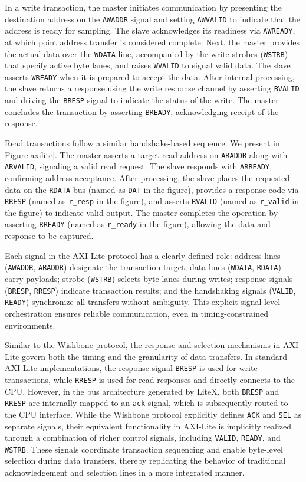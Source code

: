 In a write transaction, the master initiates communication by presenting the destination address on the \texttt{AWADDR} signal and setting \texttt{AWVALID} to indicate that the address is ready for sampling. The slave acknowledges its readiness via \texttt{AWREADY}, at which point address transfer is considered complete. Next, the master provides the actual data over the \texttt{WDATA} line, accompanied by the write strobes (\texttt{WSTRB}) that specify active byte lanes, and raises \texttt{WVALID} to signal valid data. The slave asserts \texttt{WREADY} when it is prepared to accept the data. After internal processing, the slave returns a response using the write response channel by asserting \texttt{BVALID} and driving the \texttt{BRESP} signal to indicate the status of the write. The master concludes the transaction by asserting \texttt{BREADY}, acknowledging receipt of the response.

Read transactions follow a similar handshake-based sequence. We present in Figure\ref{axilite}. The master asserts a target read address on \texttt{ARADDR} along with \texttt{ARVALID}, signaling a valid read request. The slave responds with \texttt{ARREADY}, confirming address acceptance. After processing, the slave places the requested data on the \texttt{RDATA} bus (named as \texttt{DAT} in the figure), provides a response code via \texttt{RRESP} (named as \texttt{r\_resp} in the figure), and asserts \texttt{RVALID} (named as \texttt{r\_valid} in the figure) to indicate valid output. The master completes the operation by asserting \texttt{RREADY} (named as \texttt{r\_ready} in the figure), allowing the data and response to be captured.

Each signal in the AXI-Lite protocol has a clearly defined role: address lines (\texttt{AWADDR}, \texttt{ARADDR}) designate the transaction target; data lines (\texttt{WDATA}, \texttt{RDATA}) carry payloads; strobe (\texttt{WSTRB}) selects byte lanes during writes; response signals (\texttt{BRESP}, \texttt{RRESP}) indicate transaction results; and the handshaking signals (\texttt{VALID}, \texttt{READY}) synchronize all transfers without ambiguity. This explicit signal-level orchestration ensures reliable communication, even in timing-constrained environments.

Similar to the Wishbone protocol, the response and selection mechanisms in AXI-Lite govern both the timing and the granularity of data transfers. In standard AXI-Lite implementations, the response signal \texttt{BRESP} is used for write transactions, while \texttt{RRESP} is used for read responses and directly connects to the CPU. However, in the bus architecture generated by LiteX, both \texttt{BRESP} and \texttt{RRESP} are internally mapped to an \texttt{ack} signal, which is subsequently routed to the CPU interface. While the Wishbone protocol explicitly defines \texttt{ACK} and \texttt{SEL} as separate signals, their equivalent functionality in AXI-Lite is implicitly realized through a combination of richer control signals, including \texttt{VALID}, \texttt{READY}, and \texttt{WSTRB}. These signals coordinate transaction sequencing and enable byte-level selection during data transfers, thereby replicating the behavior of traditional acknowledgement and selection lines in a more integrated manner.

